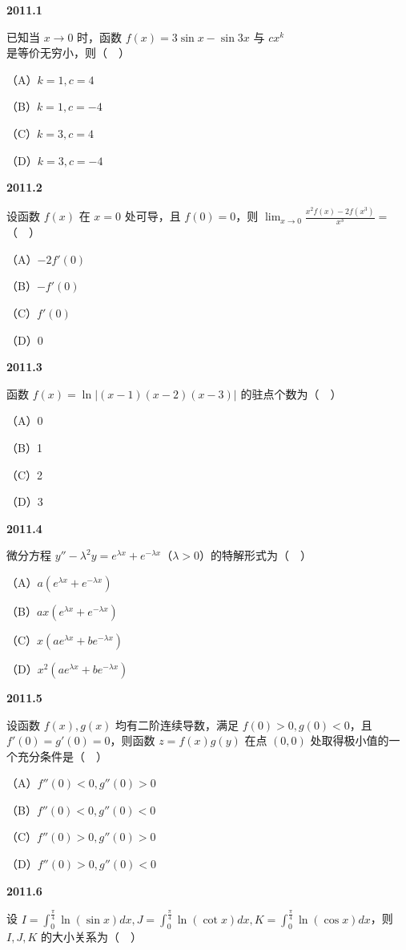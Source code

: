 \documentclass[UTF8,12pt,fontset=windows]{ctexart}
\begin{document}
{\large\bfseries 2011.1}

已知当 $x \to 0$ 时，函数 $f(x) = 3\sin x - \sin 3x$ 与 $cx^k$ 是等价无穷小，则（　）

（A）$k = 1, c = 4$

（B）$k = 1, c = -4$

（C）$k = 3, c = 4$

（D）$k = 3, c = -4$

\vfill
\newpage
{\large\bfseries 2011.2}

设函数 $f(x)$ 在 $x = 0$ 处可导，且 $f(0) = 0$，则 $\lim_{x \to 0}\frac{x^2 f(x) - 2f(x^3)}{x^3} =$（　）

（A）$-2f'(0)$

（B）$-f'(0)$

（C）$f'(0)$

（D）$0$

\vfill
\newpage
{\large\bfseries 2011.3}

函数 $f(x) = \ln|(x-1)(x-2)(x-3)|$ 的驻点个数为（　）

（A）0

（B）1

（C）2

（D）3

\vfill
\newpage
{\large\bfseries 2011.4}

微分方程 $y'' - \lambda^2 y = e^{\lambda x} + e^{-\lambda x}$（$\lambda > 0$）的特解形式为（　）

（A）$a(e^{\lambda x} + e^{-\lambda x})$

（B）$ax(e^{\lambda x} + e^{-\lambda x})$

（C）$x(ae^{\lambda x} + be^{-\lambda x})$

（D）$x^2(ae^{\lambda x} + be^{-\lambda x})$

\vfill
\newpage
{\large\bfseries 2011.5}

设函数 $f(x), g(x)$ 均有二阶连续导数，满足 $f(0) > 0, g(0) < 0$，且 $f'(0) = g'(0) = 0$，则函数 $z = f(x)g(y)$ 在点 $(0, 0)$ 处取得极小值的一个充分条件是（　）

（A）$f''(0) < 0, g''(0) > 0$

（B）$f''(0) < 0, g''(0) < 0$

（C）$f''(0) > 0, g''(0) > 0$

（D）$f''(0) > 0, g''(0) < 0$

\vfill
\newpage
{\large\bfseries 2011.6}

设 $I = \int_0^{\frac{\pi}{4}}\ln(\sin x)dx, J = \int_0^{\frac{\pi}{4}}\ln(\cot x)dx, K = \int_0^{\frac{\pi}{4}}\ln(\cos x)dx$，则 $I, J, K$ 的大小关系为（　）
\end{document}

